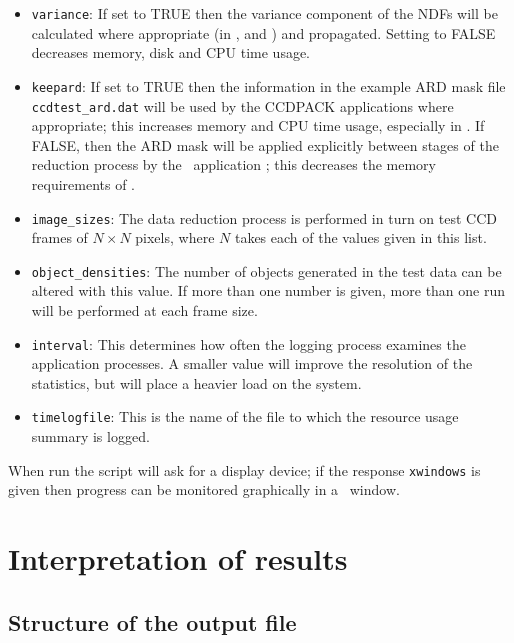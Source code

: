 \begin{itemize}
%
\item {\tt variance}: 
If set to TRUE then the variance component of the NDFs will be  
calculated where appropriate 
(in ,  and ) 
and propagated.
Setting to FALSE decreases memory, disk and CPU time usage.
%
\item {\tt keepard}:
If set to TRUE then the information in the example ARD mask file
{\tt ccdtest\_ard.dat} will be used by the 
CCDPACK applications where appropriate;
this increases memory and CPU time usage, especially in .
If FALSE, then the ARD mask will be applied explicitly 
between stages of the reduction process 
by the \KAPPAref\ application ;
this decreases the memory requirements of .
%
\item {\tt image\_sizes}:
The data reduction process is performed in turn on 
test CCD frames of $N \times N$ pixels, where $N$ takes each
of the values given in this list.
%
\item {\tt object\_densities}:
The number of objects generated in the test data can be altered
with this value.  If more than one number is given,  more than one
run will be performed at each frame size.
%
\item {\tt interval}:
This determines how often the logging process examines the 
application processes. 
A smaller value will improve the resolution of the statistics,
but will place a heavier load on the system.
%
\item {\tt timelogfile}:
This is the name of the file to which the resource usage summary is logged.
\end{itemize}

When run the script will ask for a display device;
if the response {\tt xwindows} is given then progress
can be monitored graphically in a \GWMref\ window.



\section{Interpretation of results}

\subsection{Structure of the output file}

